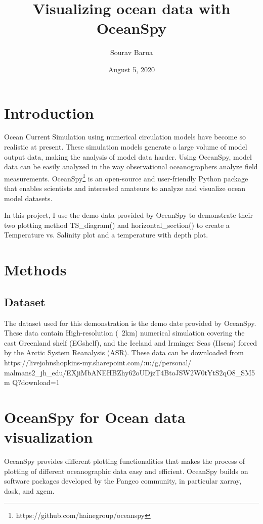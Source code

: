 \documentclass[12pt, letterpaper]{article}
\title{Visualizing ocean data with OceanSpy}
\author{Sourav Barua}
\date{August 5, 2020}
\begin{document}
\maketitle

\section{Introduction}
Ocean Current Simulation using numerical circulation models have become so realistic at present. These simulation models generate a large volume of model output data, making the analysis of model data harder. Using OceanSpy, model data can be easily analyzed in the way observational oceanographers analyze field measurements.  OceanSpy\footnote{https://github.com/hainegroup/oceanspy} is an open-source and user-friendly Python package that enables scientists and interested amateurs to analyze and visualize ocean model datasets.

In this project, I use the demo data provided by OceanSpy to demonstrate their two plotting method TS\_diagram() and horizontal\_section() to create a Temperature vs. Salinity plot and a temperature with depth plot. 
 


\section{Methods}

\subsection{Dataset}
The dataset used for this demonstration is the demo date provided by OceanSpy. These data contain High-resolution (~2km) numerical simulation covering the east Greenland shelf (EGshelf), and the Iceland and Irminger Seas (IIseas) forced by the Arctic System Reanalysis (ASR). These data can be downloaded from https://livejohnshopkins-my.sharepoint.com/:u:/g/personal/
malmans2\_jh\_edu/EXjiMbANEHBZhy62oUDjzT4BtoJSW2W0tYtS2qO8\_SM5m
Q?download=1



\section{OceanSpy for Ocean data visualization}

OceanSpy provides different plotting functionalities that makes the process of plotting of different oceanographic data easy and efficient. OceanSpy builds on software packages developed by the Pangeo community, in particular xarray, dask, and xgcm. 
\end{document}
